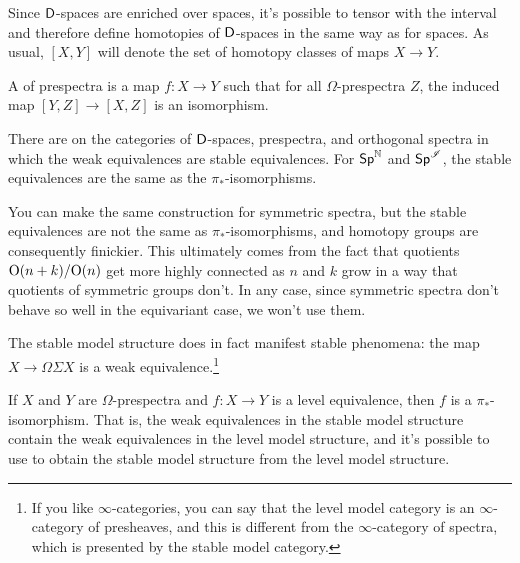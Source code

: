 Since $\mathsf D$-spaces are enriched over spaces, it's possible to tensor with the interval and therefore define
homotopies of $\mathsf D$-spaces in the same way as for spaces. As usual, $[X,Y]$ will denote the set of homotopy classes
of maps $X\to Y$.
\begin{defn}
A  of prespectra is a map $f\colon X\to Y$ such that for all $\Omega$-prespectra $Z$, the
induced map $[Y,Z]\to[X,Z]$ is an isomorphism.
\end{defn}
\begin{thm}
There are  on the categories of $\mathsf D$-spaces, prespectra, and orthogonal spectra in
which the weak equivalences are stable equivalences. For $\mathsf{Sp}^\mathbb N$ and $\mathsf{Sp}^\mathscr I$, the stable equivalences are the
same as the $\pi_*$-isomorphisms.
\end{thm}
\begin{rem}
You can make the same construction for symmetric spectra, but the stable equivalences are not the same as
$\pi_*$-isomorphisms, and homotopy groups are consequently finickier. This ultimately comes from the fact that
quotients $\mathrm O(n+k)/\mathrm O(n)$ get more highly connected as $n$ and $k$ grow in a way that quotients of symmetric groups
don't. In any case, since symmetric spectra don't behave so well in the equivariant case, we won't use them.
\end{rem}
The stable model structure does in fact manifest stable phenomena: the map $X\to\Omega\Sigma X$ is a weak
equivalence.\footnote{If you like $\infty$-categories, you can say that the level model category is an
$\infty$-category of presheaves, and this is different from the $\infty$-category of spectra, which is presented by
the stable model category.}

If $X$ and $Y$ are $\Omega$-prespectra and $f\colon X\to Y$ is a level equivalence, then $f$ is a
$\pi_*$-isomorphism. That is, the weak equivalences in the stable model structure contain the weak equivalences in
the level model structure, and it's possible to use  to obtain the stable model
structure from the level model structure.

